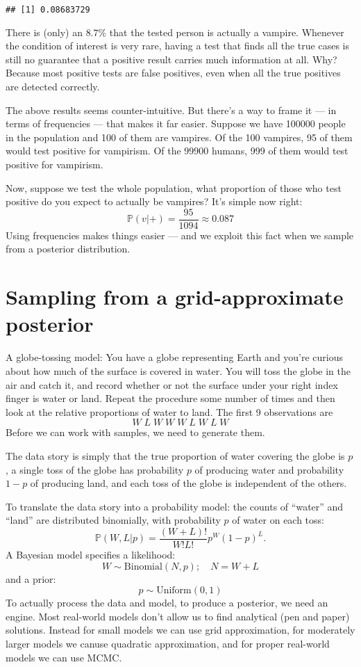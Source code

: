 \documentclass[
]{book}
\begin{document}
\begin{verbatim}
## [1] 0.08683729
\end{verbatim}

There is (only) an \(8.7\%\) that the tested person is actually a vampire. Whenever the condition of interest is very rare, having a test that finds all the true cases is still no guarantee that a positive result carries much information at all. Why? Because most positive tests are false positives, even when all the true positives are detected correctly.

The above results seems counter-intuitive. But there's a way to frame it --- in terms of frequencies --- that makes it far easier. Suppose we have 100000 people in the population and 100 of them are vampires. Of the 100 vampires, 95 of them would test positive for vampirism. Of the 99900 humans, 999 of them would test positive for vampirism.

Now, suppose we test the whole population, what proportion of those who test positive do you expect to actually be vampires? It's simple now right:
\[
\mathbb P(v|+) = \frac{95}{1094} \approx 0.087
\]
Using frequencies makes things easier --- and we exploit this fact when we sample from a posterior distribution.

\hypertarget{sampling-from-a-grid-approximate-posterior}{%
\section{Sampling from a grid-approximate posterior}\label{sampling-from-a-grid-approximate-posterior}}

A globe-tossing model: You have a globe representing Earth and you're curious about how much of the surface is covered in water. You will toss the globe in the air and catch it, and record whether or not the surface under your right index finger is water or land. Repeat the procedure some number of times and then look at the relative proportions of water to land. The first 9 observations are
\[
W\;L\;W\;W\;W\;L\;W\;L\;W
\]
Before we can work with samples, we need to generate them.

The data story is simply that the true proportion of water covering the globe is \(p\), a single toss of the globe has probability \(p\) of producing water and probability \(1-p\) of producing land, and each toss of the globe is independent of the others.

To translate the data story into a probability model: the counts of ``water'' and ``land'' are distributed binomially, with probability \(p\) of water on each toss:
\[
\mathbb P(W,L|p) = \frac{(W+L)!}{W!L!}p^W(1-p)^L.
\]
A Bayesian model specifies a likelihood:
\[
W \sim \text{Binomial}(N,p); \quad N = W + L
\]
and a prior:
\[
p \sim \text{Uniform}(0,1)
\]
To actually process the data and model, to produce a posterior, we need an engine. Most real-world models don't allow us to find analytical (pen and paper) solutions. Instead for small models we can use grid approximation, for moderately larger models we canuse quadratic approximation, and for proper real-world models we can use MCMC.
\end{document}
